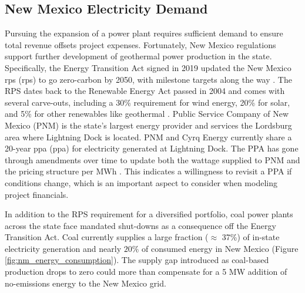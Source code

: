 \subsection{New Mexico Electricity Demand}\label{ch4:nm_rps}
Pursuing the expansion of a power plant requires sufficient demand to ensure total revenue offsets project expenses. Fortunately, New Mexico regulations support further development of geothermal power production in the state. Specifically, the Energy Transition Act signed in 2019 updated the New Mexico \acrlong{rps} (\acrshort{rps}) to go zero-carbon by 2050, with milestone targets along the way \citep{lillian_new_2019}. The RPS dates back to the Renewable Energy Act passed in 2004 and comes with several carve-outs, including a 30\% requirement for wind energy, 20\% for solar, and 5\% for other renewables like geothermal \citep{dsire_dsire_2021}. Public Service Company of New Mexico (PNM) is the state’s largest energy provider and services the Lordsburg area where Lightning Dock is located. PNM and Cyrq Energy currently share a 20-year \acrlong{ppa} (\acrshort{ppa}) for electricity generated at Lightning Dock. The PPA has gone through amendments over time to update both the wattage supplied to PNM and the pricing structure per MWh \citep[e.g.,][]{pnm_public_2014,stanfield_new_2017}. This indicates a willingness to revisit a PPA if conditions change, which is an important aspect to consider when modeling project financials.

In addition to the RPS requirement for a diversified portfolio, coal power plants across the state face mandated shut-downs as a consequence off the Energy Transition Act. Coal currently supplies a large fraction ($\approx$ 37\%) of in-state electricity generation \citep{eia_new_2021} and nearly $20\%$ of consumed energy in New Mexico (Figure \ref{fig:nm_energy_consumption}). The supply gap introduced as coal-based production drops to zero could more than compensate for a 5 MW addition of no-emissions energy to the New Mexico grid.

